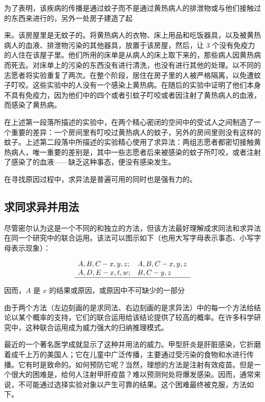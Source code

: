 为了表明，该疾病的传播是通过蚊子而不是通过黄热病人的排泄物或与他们接触过的东西来进行的，另外一处房子建造了起

\begin{displayquote}
来。该房屋里是无蚊子的。将黄热病人的衣物、床上用品和吃饭器具，以及被黄热病人的血液、排泄物污染的其他器具，放置于该房屋，然后，让 3 个没有免疫力的人住在该屋子里。他们所用的床单是从病人的床上取下来的，那些病人因黄热病而死去。对床单上的污染的东西没有进行清洗，也没有进行其他的处理。以不同的志愿者将实验重复了两次。在整个阶段，居住在房子里的人被严格隔离，以免遭蚊子叮咬。这些实验中的人没有一个感染上黄热病。在随后的实验中证明了他们本身不具有免疫力，因为他们中的四个或者引蚊子叮咬或者因注射了黄热病人的血液，而感染了黄热病。\cite{garrison1929}
\end{displayquote}

在上述第一段落所描述的实验中，在两个精心密闭的空间中的受试人之间制造了一个重要的差异：一个房间里有叮咬过黄热病人的蚊子，另外的房间里则没有这样的蚊子。上述第二段落中所描述的实验精心使用了求异法：两组志愿者都密切接触黄热病人，唯一重要的差别是，其中一些志愿者后来被感染的蚊子所叮咬，或者注射了感染了的血液——缺乏这种事态，便没有感染发生。

在寻找原因过程中，求异法是普遍可用的同时也是强有力的。

\subsection{求同求异并用法}
尽管密尔认为这是一个不同的和独立的方法，但该方法最好理解成求同法和求异法在同一个研究中的联合运用。该法可以图示如下（也用大写字母表示事态、小写字母表示现象）：

$$
\begin{array}{ll}
A, B, C-x, y, z ; & A, B, C-x, y, z \\
A, D, E-x, t, w ; & B, C-y, z \\
\hline
\end{array}
$$

因而，$A$ 是 $x$ 的结果或原因，或原因中不可缺少的一部分

由于两个方法（左边刻画的是求同法、右边刻画的是求异法）中的每一个方法给结论以某个概率的支持，它们的联合运用给该结论提供了较高的概率。在许多科学研究中，这种联合运用成为威力强大的归纳推理模式。

最近的一个著名医学成就显示了这种并用法的威力。甲型肝炎是肝脏感染，它折磨着成千上万的美国人；它在儿童中广泛传播，主要通过受污染的食物和水进行传播。它有时是致命的。如何预防它呢？当然，理想的方法是注射有效疫苗。但是一个很大的困难是，给何人注射甲肝疫苗？难以预测何处将爆发感染。因而，通常来说，不可能通过选择实验对象以产生可靠的结果。这个困难最终被克服，方法如下。

